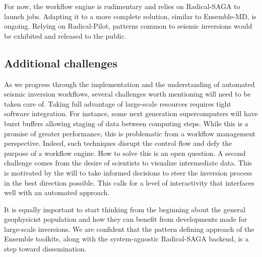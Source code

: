 For now, the workflow engine is rudimentary and relies on Radical-SAGA to launch
jobs. Adapting it to a more complete solution, similar to Ensemble-MD, is
ongoing. Relying on Radical-Pilot, patterns common to seismic inversions would
be exhibited and released to the public.

\subsection{Additional challenges}

As we progress through the implementation and the understanding of automated
seismic inversion workflows, several challenges worth mentioning will need to
be taken care of.
Taking full advantage of large-scale resources requires tight software
integration. For instance, some next generation supercomputers will have burst
buffers allowing staging of data between computing steps. While this is a promise
of greater performance, this is problematic from a workflow management
perspective. Indeed, such techniques disrupt the control flow and defy the
purpose of a workflow engine. How to solve this is an open question.
A second challenge comes from the desire of scientists to visualize intermediate
data. This is motivated by the will to take informed decisions to steer the
inversion process in the best direction possible. This calls for a level of
interactivity that interfaces well with an automated approach.

It is equally important to start thinking from the beginning about the general
geophysicist population and how they can benefit from developments made
for large-scale inversions. We are confident that the pattern defining approach
of the Ensemble toolkits, along with the system-agnostic Radical-SAGA backend,
is a step toward dissemination.
